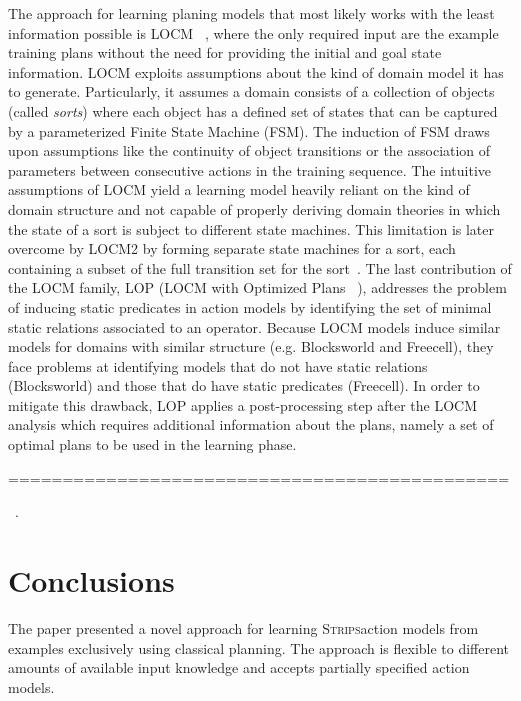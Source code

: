 \documentclass[letterpaper]{article} %
\newcommand{\strips}{\textsc{Strips}}     %
\begin{document}
The approach for learning planing models that most likely works with the least information possible is {\sf LOCM} ~\cite{cresswell2013acquiring}, where the only required input are the example training plans without the need for providing the initial and goal state information. {\sf LOCM} exploits assumptions about the kind of domain model it has to generate. Particularly, it assumes a domain consists of a collection of objects (called \emph{sorts}) where each object has a defined set of states that can be captured by a parameterized Finite State Machine (FSM). The induction of FSM draws upon assumptions like the continuity of object transitions or the association of parameters between consecutive actions in the training sequence. The intuitive assumptions of {\sf LOCM} yield a learning model heavily reliant on the kind of domain structure and not capable of properly deriving domain theories in which the state of a sort is subject to different state machines. This limitation is later overcome by {\sf LOCM2} by forming separate state machines for a sort, each containing a subset of the full transition set for the sort~\cite{cresswell2011generalised}. The last contribution of the {\sf LOCM} family, {\sf LOP} ({\sf LOCM} with Optimized Plans ~\cite{GregoryC16}), addresses the problem of inducing static predicates in action models by identifying the set of minimal static relations associated to an operator. Because {\sf LOCM} models induce similar models for domains with similar structure (e.g. Blocksworld and Freecell), they face problems at identifying models that do not have static relations (Blocksworld) and those that do have static predicates (Freecell). In order to mitigate this drawback, {\sf LOP} applies a post-processing step after the {\sf LOCM} analysis which requires additional information about the plans, namely a set of optimal plans to be used in the learning phase.




==============================================








~\cite{stern2017efficient}.


\section{Conclusions}
The paper presented a novel approach for learning \strips action models from examples exclusively using classical planning. The approach is flexible to different amounts of available input knowledge and accepts partially specified action models.
\end{document}
